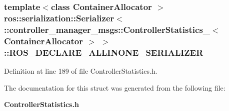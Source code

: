 \subsubsection[{\-R\-O\-S\-\_\-\-D\-E\-C\-L\-A\-R\-E\-\_\-\-A\-L\-L\-I\-N\-O\-N\-E\-\_\-\-S\-E\-R\-I\-A\-L\-I\-Z\-E\-R}]{\setlength{\rightskip}{0pt plus 5cm}template$<$class Container\-Allocator $>$ ros\-::serialization\-::\-Serializer$<$ \-::{\bf controller\-\_\-manager\-\_\-msgs\-::\-Controller\-Statistics\-\_\-}$<$ \-Container\-Allocator $>$ $>$\-::{\bf \-R\-O\-S\-\_\-\-D\-E\-C\-L\-A\-R\-E\-\_\-\-A\-L\-L\-I\-N\-O\-N\-E\-\_\-\-S\-E\-R\-I\-A\-L\-I\-Z\-E\-R}}\label{structros_1_1serialization_1_1Serializer_3_01_1_1controller__manager__msgs_1_1ControllerStatistie8392c6e7fb9286690bd4c7cc9106f66_afcbc51f6e3dd4753294fb76b3e0431dc}


\-Definition at line 189 of file \-Controller\-Statistics.\-h.



\-The documentation for this struct was generated from the following file\-:\begin{DoxyCompactItemize}
\item 
{\bf \-Controller\-Statistics.\-h}\end{DoxyCompactItemize}
